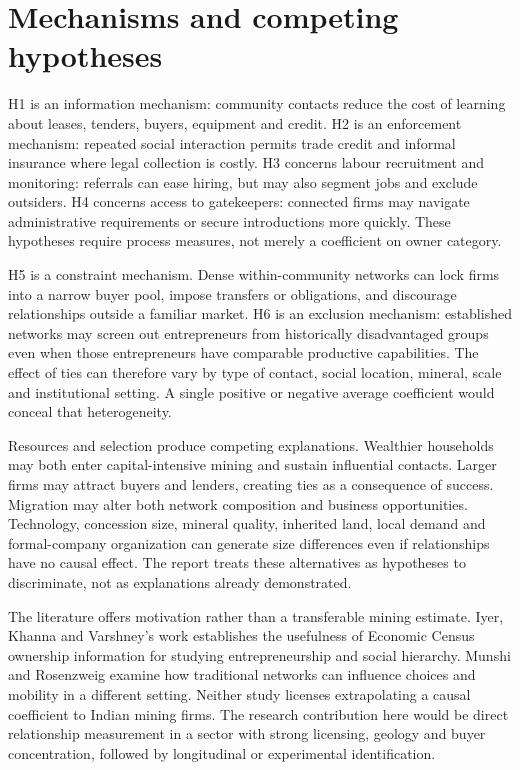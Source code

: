 \documentclass[11pt,a4paper]{report}
\begin{document}
\section{Mechanisms and competing hypotheses}
H1 is an information mechanism: community contacts reduce the cost of learning about leases, tenders, buyers, equipment and credit. H2 is an enforcement mechanism: repeated social interaction permits trade credit and informal insurance where legal collection is costly. H3 concerns labour recruitment and monitoring: referrals can ease hiring, but may also segment jobs and exclude outsiders. H4 concerns access to gatekeepers: connected firms may navigate administrative requirements or secure introductions more quickly. These hypotheses require process measures, not merely a coefficient on owner category.

H5 is a constraint mechanism. Dense within-community networks can lock firms into a narrow buyer pool, impose transfers or obligations, and discourage relationships outside a familiar market. H6 is an exclusion mechanism: established networks may screen out entrepreneurs from historically disadvantaged groups even when those entrepreneurs have comparable productive capabilities. The effect of ties can therefore vary by type of contact, social location, mineral, scale and institutional setting. A single positive or negative average coefficient would conceal that heterogeneity.

Resources and selection produce competing explanations. Wealthier households may both enter capital-intensive mining and sustain influential contacts. Larger firms may attract buyers and lenders, creating ties as a consequence of success. Migration may alter both network composition and business opportunities. Technology, concession size, mineral quality, inherited land, local demand and formal-company organization can generate size differences even if relationships have no causal effect. The report treats these alternatives as hypotheses to discriminate, not as explanations already demonstrated.

The literature offers motivation rather than a transferable mining estimate. Iyer, Khanna and Varshney's work establishes the usefulness of Economic Census ownership information for studying entrepreneurship and social hierarchy. Munshi and Rosenzweig examine how traditional networks can influence choices and mobility in a different setting. Neither study licenses extrapolating a causal coefficient to Indian mining firms. The research contribution here would be direct relationship measurement in a sector with strong licensing, geology and buyer concentration, followed by longitudinal or experimental identification.
\end{document}
